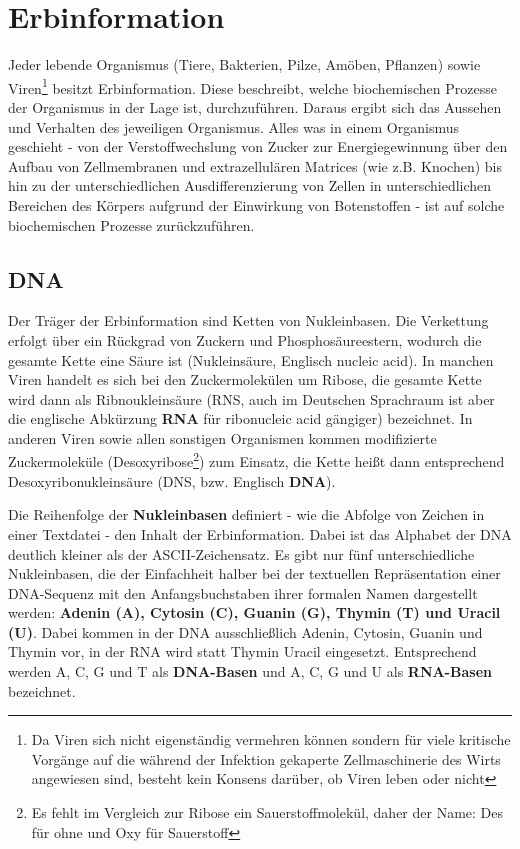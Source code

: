 \section{Erbinformation}
  Jeder lebende Organismus (Tiere, Bakterien, Pilze, Amöben, Pflanzen) sowie Viren\footnote{Da Viren sich nicht eigenständig vermehren können sondern für viele kritische Vorgänge auf die während der Infektion gekaperte Zellmaschinerie des Wirts angewiesen sind, besteht kein Konsens darüber, ob Viren leben oder nicht} besitzt Erbinformation. Diese beschreibt, welche biochemischen Prozesse der Organismus in der Lage ist, durchzuführen. Daraus ergibt sich das Aussehen und Verhalten des jeweiligen Organismus. Alles was in einem Organismus geschieht - von der Verstoffwechslung von Zucker zur Energiegewinnung über den Aufbau von Zellmembranen und extrazellulären Matrices (wie z.B. Knochen) bis hin zu der unterschiedlichen Ausdifferenzierung von Zellen in unterschiedlichen Bereichen des Körpers aufgrund der Einwirkung von Botenstoffen - ist auf solche biochemischen Prozesse zurückzuführen. 

\subsection{DNA}
  Der Träger der Erbinformation sind Ketten von Nukleinbasen. Die Verkettung erfolgt über ein Rückgrad von Zuckern und Phosphosäureestern, wodurch die gesamte Kette eine Säure ist (Nukleinsäure, Englisch nucleic acid). In manchen Viren handelt es sich bei den Zuckermolekülen um Ribose, die gesamte Kette wird dann als Ribnoukleinsäure (RNS, auch im Deutschen Sprachraum ist aber die englische Abkürzung \textbf{RNA} für ribonucleic acid gängiger) bezeichnet. In anderen Viren sowie allen sonstigen Organismen kommen modifizierte Zuckermoleküle (Desoxyribose\footnote{Es fehlt im Vergleich zur Ribose ein Sauerstoffmolekül, daher der Name: Des für ohne und Oxy für Sauerstoff}) zum Einsatz, die Kette heißt dann entsprechend Desoxyribonukleinsäure (DNS, bzw. Englisch \textbf{DNA}). 

  Die Reihenfolge der \textbf{Nukleinbasen} definiert - wie die Abfolge von Zeichen in einer Textdatei - den Inhalt der Erbinformation. Dabei ist das Alphabet der DNA deutlich kleiner als der ASCII-Zeichensatz. Es gibt nur fünf unterschiedliche Nukleinbasen, die der Einfachheit halber bei der textuellen Repräsentation einer DNA-Sequenz mit den Anfangsbuchstaben ihrer formalen Namen dargestellt werden: \textbf{Adenin (A), Cytosin (C), Guanin (G), Thymin (T) und Uracil (U)}. Dabei kommen in der DNA ausschließlich Adenin, Cytosin, Guanin und Thymin vor, in der RNA wird statt Thymin Uracil eingesetzt. Entsprechend werden A, C, G und T als \textbf{DNA-Basen} und A, C, G und U als \textbf{RNA-Basen} bezeichnet. 

